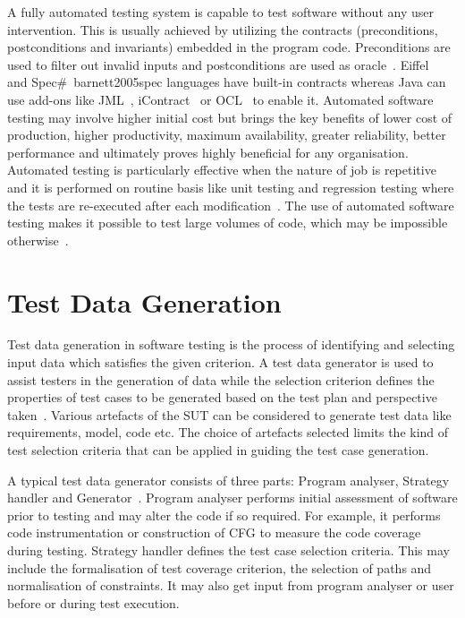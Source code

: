 A fully automated testing system is capable to test software without any user intervention. This is usually achieved by utilizing the contracts (preconditions, postconditions and invariants) embedded in the program code. Preconditions are used to filter out invalid inputs and postconditions are used as oracle~\cite{leitner2007reconciling}. Eiffel~\cite{ecma2005367} and Spec\#~{barnett2005spec} languages have built-in contracts whereas Java can use add-ons like JML~\cite{leavensjml}, iContract~\cite{kramer1998icontract} or OCL~\cite{richters1998formalizing} to enable it. 
Automated software testing may involve higher initial cost but brings the key benefits of lower cost of production, higher productivity, maximum availability, greater reliability, better performance and ultimately proves highly beneficial for any organisation. Automated testing is particularly effective when the nature of job is repetitive and it is performed on routine basis like unit testing and regression testing where the tests are re-executed after each modification~\cite{huang2003automated}. The use of automated software testing makes it possible to test large volumes of code, which may be impossible otherwise~\cite{ramamoorthy1975testing}.

\section{Test Data Generation}
Test data generation in software testing is the process of identifying and selecting input data which satisfies the given criterion. A test data generator is used to assist testers in the generation of data while the selection criterion defines the properties of test cases to be generated based on the test plan and perspective taken~\cite{korel1990automated}. Various artefacts of the SUT can be considered to generate test data like requirements, model, code etc. The choice of artefacts selected limits the kind of test selection criteria that can be applied in guiding the test case generation. 

A typical test data generator consists of three parts: Program analyser, Strategy handler and Generator~\cite{edvardsson1999survey}. Program analyser performs initial assessment of software prior to testing and may alter the code if so required. For example, it performs code instrumentation or construction of CFG to measure the code coverage during testing. Strategy handler defines the test case selection criteria. This may include the formalisation of test coverage criterion, the selection of paths and normalisation of constraints. It may also get input from program analyser or user before or during test execution.

